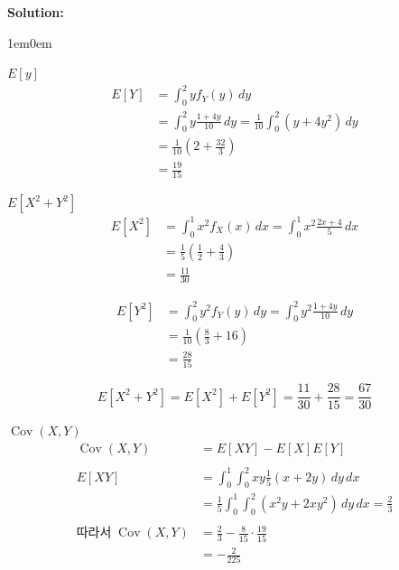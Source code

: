 \documentclass{article}
\newenvironment{solution}
{
    \par\medskip
    \noindent\textbf{Solution:}
    \begin{adjustwidth}{1em}{0em}
}
{
    \end{adjustwidth}
    \medskip
}
\begin{document}
\begin{enumerate}[label=\textbf{\arabic*.}, leftmargin=*]
\begin{solution}
\begin{enumerate}[label=(\alph*), leftmargin=2em, itemsep=1em]
            $E[y]$  
            \begin{align*}
                E[Y]&=\int_0^2 y f_Y(y)\,dy\\
                &=\int_0^2 y\frac{1+4y}{10}\,dy=\frac1{10}\int_0^2(y+4y^2)\,dy\\
                &=\frac1{10}\left(2+\frac{32}{3}\right)\\
                &=\frac{19}{15}  
            \end{align*}
            
            $E[X^2+Y^2]$ 
            \begin{align*}
                E[X^2]&=\int_0^1 x^2 f_X(x)\,dx=\int_0^1 x^2\frac{2x+4}{5}\,dx \\
                &=\frac15\left(\frac12+\frac43\right)\\
                &=\frac{11}{30}                
            \end{align*}  

            \begin{align*}
                E[Y^2]&=\int_0^2 y^2 f_Y(y)\,dy=\int_0^2 y^2\frac{1+4y}{10}\,dy\\
                &=\frac1{10}\left(\frac83+16\right)\\
                &=\frac{28}{15}
            \end{align*}  

            $$  
            E[X^2+Y^2]=E[X^2]+E[Y^2]=\frac{11}{30}+\frac{28}{15}=\frac{67}{30}  
            $$  

            $\operatorname{Cov}(X,Y)$
            \begin{align*}
                \operatorname{Cov}(X,Y)&=E[XY]-E[X]E[Y] \\
                \\
                E[XY]&=\int_0^1\int_0^2 xy\frac15(x+2y)\,dy\,dx\\
                &=\frac15\int_0^1\int_0^2(x^2y+2xy^2)\,dy\,dx=\frac23 \\
                \\
                \text{따라서} \;\operatorname{Cov}(X,Y)&=\frac23-\frac{8}{15}\cdot\frac{19}{15}\\
                &=-\frac{2}{225} 
            \end{align*}  
            

\end{enumerate}
\end{solution}
\end{enumerate}
\end{document}
